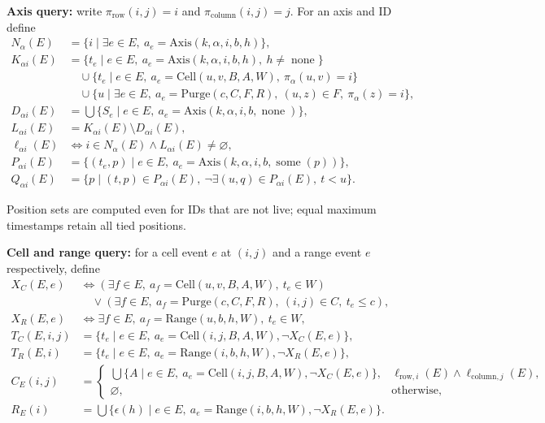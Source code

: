 \textbf{Axis query:} write $\pi_{\mathrm{row}}(i,j)=i$ and $\pi_{\mathrm{column}}(i,j)=j$. For an axis and ID define
\[
\begin{aligned}N_\alpha(E)&=\{i\mid\exists e\in E,\ a_e=\mathrm{Axis}(k,\alpha,i,b,h)\},\\K_{\alpha i}(E)&=\{t_e\mid e\in E,\ a_e=\mathrm{Axis}(k,\alpha,i,b,h),\ h\ne\operatorname{none}\}\\&\quad\cup\{t_e\mid e\in E,\ a_e=\mathrm{Cell}(u,v,B,A,W),\ \pi_\alpha(u,v)=i\}\\&\quad\cup\{u\mid\exists e\in E,\ a_e=\mathrm{Purge}(c,C,F,R),\ (u,z)\in F,\ \pi_\alpha(z)=i\},\\D_{\alpha i}(E)&=\bigcup\{S_e\mid e\in E,\ a_e=\mathrm{Axis}(k,\alpha,i,b,\operatorname{none})\},\\L_{\alpha i}(E)&=K_{\alpha i}(E)\setminus D_{\alpha i}(E),\\\ell_{\alpha i}(E)&\iff i\in N_\alpha(E)\land L_{\alpha i}(E)\ne\varnothing,\\P_{\alpha i}(E)&=\{(t_e,p)\mid e\in E,\ a_e=\mathrm{Axis}(k,\alpha,i,b,\operatorname{some}(p))\},\\Q_{\alpha i}(E)&=\{p\mid(t,p)\in P_{\alpha i}(E),\ \neg\exists(u,q)\in P_{\alpha i}(E),\ t<u\}.\end{aligned}
\]

Position sets are computed even for IDs that are not live; equal maximum timestamps retain all tied positions.

\textbf{Cell and range query:} for a cell event $e$ at $(i,j)$ and a range event $e$ respectively, define
\[
\begin{aligned}X_C(E,e)&\iff(\exists f\in E,\ a_f=\mathrm{Cell}(u,v,B,A,W),\ t_e\in W)\\&\quad\lor(\exists f\in E,\ a_f=\mathrm{Purge}(c,C,F,R),\ (i,j)\in C,\ t_e\le c),\\X_R(E,e)&\iff\exists f\in E,\ a_f=\mathrm{Range}(u,b,h,W),\ t_e\in W,\\T_C(E,i,j)&=\{t_e\mid e\in E,\ a_e=\mathrm{Cell}(i,j,B,A,W),\neg X_C(E,e)\},\\T_R(E,i)&=\{t_e\mid e\in E,\ a_e=\mathrm{Range}(i,b,h,W),\neg X_R(E,e)\},\\C_E(i,j)&=\begin{cases}\displaystyle\bigcup\{A\mid e\in E,\ a_e=\mathrm{Cell}(i,j,B,A,W),\neg X_C(E,e)\},&\ell_{\mathrm{row},i}(E)\land\ell_{\mathrm{column},j}(E),\\\varnothing,&\text{otherwise},\end{cases}\\R_E(i)&=\bigcup\{\epsilon(h)\mid e\in E,\ a_e=\mathrm{Range}(i,b,h,W),\neg X_R(E,e)\}.\end{aligned}
\]

